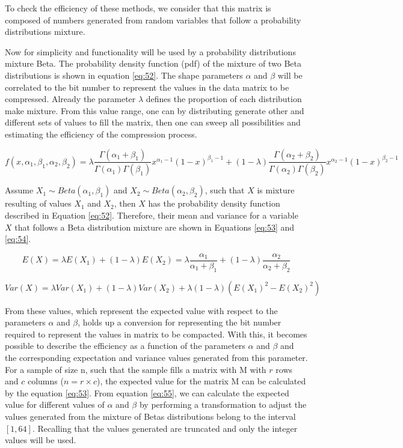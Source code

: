 \documentclass[10pt]{article}
\begin{document}
To check the efficiency of these methods, we consider that this matrix is composed of numbers generated from random variables that follow a probability distributions mixture.
 
Now for simplicity and functionality will be used by a probability distributions mixture Beta. The probability density function (pdf) of the mixture of two Beta distributions is shown in equation \ref{eq:52}. The shape parameters $\alpha$ and $\beta$ will be correlated to the bit number to represent the values ​​in the data matrix to be compressed. Already the parameter $\lambda$ defines the proportion of each distribution make mixture. From this value range​​, one can by distributing generate other and different sets of values ​​to fill the matrix, then one can sweep all possibilities and estimating the efficiency of the compression process.

\begin{equation}\label{eq:52}
 f(x,\alpha_1,\beta_1,\alpha_2,\beta_2) = \lambda\frac{\Gamma(\alpha_1+\beta_1)}{\Gamma(\alpha_1)\Gamma(\beta_1)}x^{\alpha_1-1}(1-x)^{\beta_1-1} + (1-\lambda)\frac{\Gamma(\alpha_2+\beta_2)}{\Gamma(\alpha_2)\Gamma(\beta_2)}x^{\alpha_2-1}(1-x)^{\beta_2-1}
\end{equation}

Assume $ X_1 \sim Beta(\alpha_1,\beta_1)$ and $X_2 \sim Beta(\alpha_2,\beta_2)$, such that $X$ is mixture resulting of values $X_1$ and $X_2$, then $X$ has the probability density function described in Equation \ref{eq:52}. Therefore, their mean and variance for a variable $X$ that follows a Beta distribution mixture are shown in Equations \ref{eq:53} and \ref{eq:54}.

\begin{equation}\label{eq:53}
 E(X) = \lambda E(X_1) + (1-\lambda) E(X_2) = \lambda \frac{\alpha_1}{\alpha_1+\beta_1} + (1-\lambda)\frac{\alpha_2}{\alpha_2+\beta_2}
\end{equation}

\begin{equation}\label{eq:54}
 Var(X) = \lambda Var(X_1) + (1-\lambda) Var(X_2) + \lambda (1-\lambda) (E(X_1)^2 - E(X_2)^2)
 \end{equation}

From these values​​, which represent the expected value with respect to the parameters $\alpha$ and $\beta$, holds up a conversion for representing the bit number required to represent the values ​​in matrix to be compacted. With this, it becomes possible to describe the efficiency as a function of the parameters $\alpha$ and $\beta$ and the corresponding expectation and variance values ​​generated from this parameter. For a sample of size n, such that the sample fills a matrix with M with $r$ rows and $c$ columns ($n = r  \times c$), the expected value for the matrix M can be calculated by the equation \ref{eq:53}. From equation \ref{eq:55}, we can calculate the expected value for different values ​​of $\alpha$ and $\beta$ by performing a transformation to adjust the values ​​generated from the mixture of Betas distributions belong to the interval $[1,64]$. Recalling that the values ​​generated are truncated and only the integer values ​​will be used.
\end{document}
